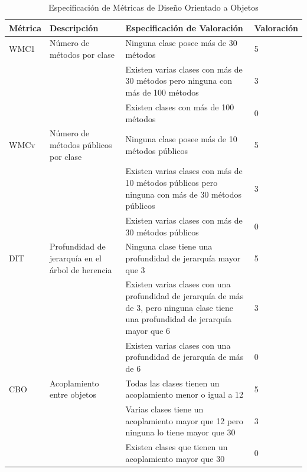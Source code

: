 \documentclass[11pt]{article}
\begin{document}
\begin{table}[H]
  \begin{center}
    \begin{tabular}{ | p{1.6cm} | p{3cm} | p{8cm} | p{2cm} | }
    \toprule
    \textbf{Métrica} & \textbf{Descripción} & \textbf{Especificación de Valoración} & \textbf{Valoración} \\
    \hline
    WMC1 & Número de métodos por clase & Ninguna clase posee más de 30 métodos & 5 \\ \cline{3-3} \cline{4-4} 
    & & Existen varias clases con más de 30 métodos pero ninguna con más de 100 métodos & 3 \\ \cline{3-3}\cline{4-4}
    & & Existen clases con más de 100 métodos & 0 \\ \cline{3-3}\cline{4-4}
    \hline
    WMCv & Número de métodos públicos por clase & Ninguna clase posee más de 10 métodos públicos & 5 \\ \cline{3-3} \cline{4-4} 
    & & Existen varias clases con más de 10 métodos públicos pero ninguna con más de 30 métodos públicos & 3 \\ \cline{3-3}\cline{4-4}
    & & Existen varias clases con más de 30 métodos públicos & 0 \\ \cline{3-3}\cline{4-4}
    \hline
    DIT & Profundidad de jerarquía en el árbol de herencia & Ninguna clase tiene una profundidad de jerarquía mayor que 3 & 5 \\ \cline{3-3} \cline{4-4} 
    & & Existen varias clases con una profundidad de jerarquía de más de 3, pero ninguna clase tiene una profundidad de jerarquía mayor que 6 & 3 \\ \cline{3-3}\cline{4-4}
    & & Existen varias clases con una profundidad de jerarquía de más de 6  & 0 \\ \cline{3-3}\cline{4-4}
    \hline
    CBO & Acoplamiento entre objetos & Todas las clases tienen un acoplamiento menor o igual a 12 & 5 \\ \cline{3-3} \cline{4-4} 
    & & Varias clases tiene un acoplamiento mayor que 12 pero ninguna lo tiene mayor que 30 & 3 \\ \cline{3-3}\cline{4-4}
    & & Existen clases que tienen un acoplamiento mayor que 30 & 0 \\ 
    \bottomrule
    \end{tabular}
    \caption{Especificación de Métricas de Diseño Orientado a Objetos}
    \label{tab:metrics_ood}
  \end{center}
\end{table}
\end{document}
